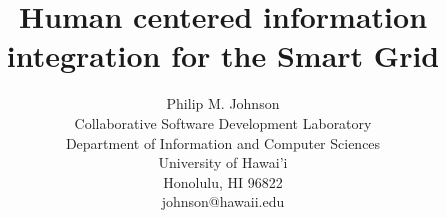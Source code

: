 \documentclass{proposalnsf}
\begin{document}
\title{Human centered information integration for the Smart Grid}

\author{Philip M. Johnson \\
      Collaborative Software Development Laboratory \\
      Department of Information and Computer Sciences \\
      University of Hawai'i \\
      Honolulu, HI 96822 \\
      johnson@hawaii.edu\\
}

\maketitle




\end{document}
